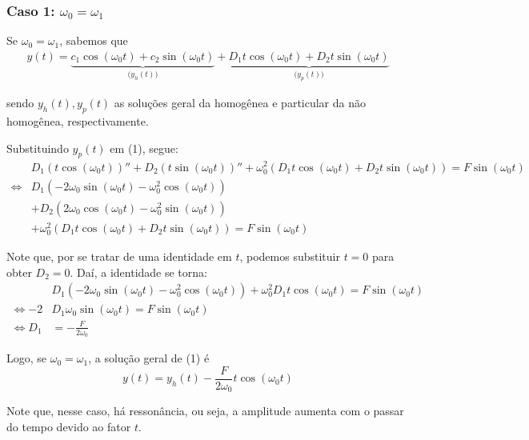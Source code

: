 \documentclass{article}
\begin{document}
\subsubsection{Caso 1: $\omega_0 = \omega_1$}
\par\hspace{12pt} Se $\omega_0 = \omega_1$, sabemos que 
\begin{align*}
y(t) = \underbrace{c_1\cos(\omega_0t) + c_2\sin(\omega_0t)}_{\big (y_h(t)\big)} + \underbrace{D_1t\cos(\omega_0t) + D_2t\sin(\omega_0t)}_{\big (y_p(t)\big)}
\end{align*}
\par sendo $y_h(t), y_p(t)$ as soluções geral da homogênea e particular da não homogênea, respectivamente. 
\par Substituindo $y_p(t)$ em (1), segue:
\begin{align*}
&D_1(t\cos(\omega_0t))'' + D_2(t\sin(\omega_0t))'' + \omega_0 ^2(D_1t\cos(\omega_0t) + D_2t\sin(\omega_0t)) = F\sin(\omega_0t) \\ \Leftrightarrow &D_1(-2\omega_0\sin(\omega_0t) - \omega_0 ^2\cos(\omega_0t))  \\ &+ D_2(2\omega_0\cos(\omega_0t) - \omega_0 ^2\sin(\omega_0t))  \\ &+ \omega_0 ^2 (D_1t\cos(\omega_0t) + D_2t\sin(\omega_0t)) = F\sin(\omega_0t)
\end{align*}
\par Note que, por se tratar de uma identidade em $t$, podemos substituir $t = 0$ para obter $D_2 = 0$. Daí, a identidade se torna:
\begin{align*}
&D_1(-2\omega_0\sin(\omega_0t) - \omega_0 ^2\cos(\omega_0t)) + \omega_0 ^2 D_1t\cos(\omega_0t) = F\sin(\omega_0t) \\ \Leftrightarrow -2&D_1\omega_0\sin(\omega_0t) = F\sin(\omega_0t) \\ \Leftrightarrow D_1& = -\frac{F}{2\omega_0}
\end{align*}
\par Logo, se $\omega_0 = \omega_1$, a solução geral de (1) é
\begin{equation*}
y(t) = y_h(t) - \frac{F}{2\omega_0}t\cos(\omega_0t)
\end{equation*}
\par Note que, nesse caso, há ressonância, ou seja, a amplitude aumenta com o passar do tempo devido ao fator $t$. 
\end{document}
